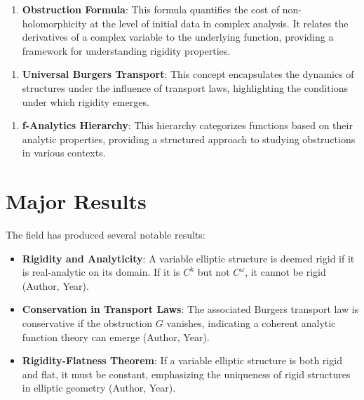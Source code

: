 \documentclass[11pt,a4paper]{article}
\begin{document}
\begin{enumerate}
\item \textbf{Obstruction Formula}: This formula quantifies the cost of non-holomorphicity at the level of initial data in complex analysis. It relates the derivatives of a complex variable to the underlying function, providing a framework for understanding rigidity properties.
\end{enumerate}

\begin{enumerate}
\item \textbf{Universal Burgers Transport}: This concept encapsulates the dynamics of structures under the influence of transport laws, highlighting the conditions under which rigidity emerges.
\end{enumerate}

\begin{enumerate}
\item \textbf{f-Analytics Hierarchy}: This hierarchy categorizes functions based on their analytic properties, providing a structured approach to studying obstructions in various contexts.
\end{enumerate}

\section{Major Results}

The field has produced several notable results:

\begin{itemize}
\item \textbf{Rigidity and Analyticity}: A variable elliptic structure is deemed rigid if it is real-analytic on its domain. If it is \( C^k \) but not \( C^\omega \), it cannot be rigid (Author, Year).
\end{itemize}

\begin{itemize}
\item \textbf{Conservation in Transport Laws}: The associated Burgers transport law is conservative if the obstruction \( G \) vanishes, indicating a coherent analytic function theory can emerge (Author, Year).
\end{itemize}

\begin{itemize}
\item \textbf{Rigidity-Flatness Theorem}: If a variable elliptic structure is both rigid and flat, it must be constant, emphasizing the uniqueness of rigid structures in elliptic geometry (Author, Year).
\end{itemize}
\end{document}
